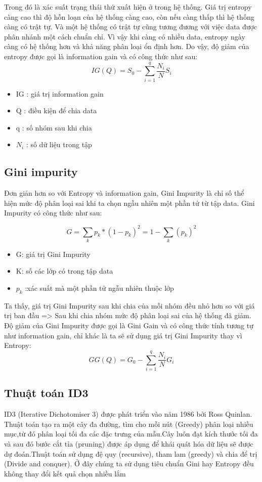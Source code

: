 \documentclass[lineno]{biometrika}
\begin{document}
Trong đó  là xác suất trạng thái thứ  xuất hiện ở trong hệ thống. Giá trị entropy càng cao thì độ hỗn loạn của hệ thống càng cao, còn nếu càng thấp thì hệ thống càng có trật tự. Và một hệ thống có trật tự cũng tương đương với việc data được phân nhánh một cách chuẩn chỉ. Vì vậy khi càng có nhiều data, entropy ngày càng có hệ thống hơn và khả năng phân loại ổn định hơn. Do vậy, độ giảm của entropy được gọi là information gain và có công thức như sau:
    $$ IG(Q) = S_0 - \sum_{i=1}^q {\frac{N_i}{N}}S_i   $$ 
    
\begin{itemize}
\item IG : giá trị information gain
\item Q : điều kiện để chia data
\item q : số nhóm sau khi chia
\item $N_i$ : số dữ liệu trong tập
\end{itemize}
\subsection {Gini impurity}
Đơn giản hơn so với Entropy và information gain, Gini Impurity là chỉ số thể hiện mức độ phân loại sai khi ta chọn ngẫu nhiên một phần tử từ tập data. Gini Impurity có công thức như sau:

  $$ G=\sum_{k} p_k * (1-p_k)^2 = 1- \sum_{k} (p_k)^2 $$
 

\begin{itemize}
\item G: giá trị Gini Impurity
\item K: số các lớp có trong tập data
\item $p_k$ :xác suất mà một phần tử ngẫu nhiên thuộc lớp 
\end{itemize}
 Ta thấy, giá trị Gini Impurity sau khi chia của mỗi nhóm đều nhỏ hơn so với giá trị ban đầu => Sau khi chia nhóm mức độ phân loại sai của hệ thống đã giảm. Độ giảm của Gini Impurity được gọi là Gini Gain và có công thức tính tương tự như information gain, chỉ khác là ta sẽ sử dụng giá trị Gini Impurity thay vì Entropy:
    $$ GG(Q)= G_0 - \sum_{i=1}^q \frac{N_i}{N} G_i $$
\subsection {Thuật toán ID3}
ID3 (Iterative Dichotomiser 3) được phát triển vào năm 1986 bởi Ross Quinlan. Thuật toán tạo ra một cây đa đường, tìm cho mỗi nút (Greedy) phân loại nhiều mục,từ đó phân loại tối đa các đặc trưng của mẫu.Cây luôn đạt kích thước tối đa và sau đó bước cắt tỉa (pruning) được áp dụng để khái quát hóa dữ liệu sẽ được dự đoán.Thuật toán sử dụng đệ quy (recursive), tham lam (greedy) và chia để trị (Divide and conquer). Ở đây chúng ta sử dụng tiêu chuẩn Gini hay Entropy đều không thay đổi kết quả chọn nhiều lắm 
\end{document}
